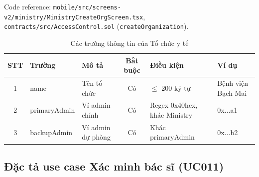 \documentclass[../DoAn]{subfiles}
\begin{document}
Code reference: \texttt{mobile/src/screens-v2/ministry/MinistryCreateOrgScreen.tsx}, \texttt{contracts/src/AccessControl.sol} (\texttt{createOrganization}).

\begin{table}[H]
\centering
\caption{Các trường thông tin của Tổ chức y tế}
\label{tab:uc010-fields}
\small
\renewcommand{\arraystretch}{1.2}
\begin{tabular}{|c|p{2.8cm}|p{4cm}|c|p{2.3cm}|p{2.2cm}|}
\hline
\textbf{STT} & \textbf{Trường} & \textbf{Mô tả} & \textbf{Bắt buộc} & \textbf{Điều kiện} & \textbf{Ví dụ} \\ \hline
1 & name & Tên tổ chức & Có & $\le$ 200 ký tự & Bệnh viện Bạch Mai \\ \hline
2 & primaryAdmin & Ví admin chính & Có & Regex 0x40hex, khác Ministry & 0x...a1 \\ \hline
3 & backupAdmin & Ví admin dự phòng & Có & Khác primaryAdmin & 0x...b2 \\ \hline
\end{tabular}
\end{table}

\subsection{Đặc tả use case Xác minh bác sĩ (UC011)}
\end{document}
